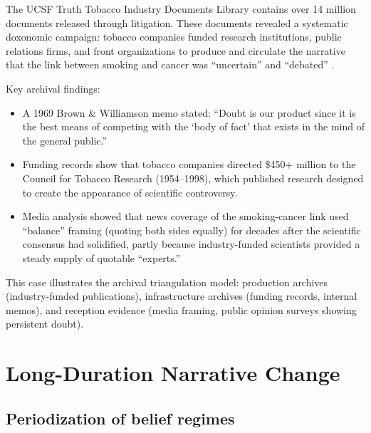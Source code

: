 \begin{example}
\label{ex:tobacco-archives}
The UCSF Truth Tobacco Industry Documents Library contains over 14 million documents released through litigation.
These documents revealed a systematic doxonomic campaign: tobacco companies funded research institutions, public relations firms, and front organizations to produce and circulate the narrative that the link between smoking and cancer was ``uncertain'' and ``debated'' \autocite{oreskes2010}.

Key archival findings:
\begin{itemize}[nosep]
  \item A 1969 Brown \& Williamson memo stated: ``Doubt is our product since it is the best means of competing with the `body of fact' that exists in the mind of the general public.''
  \item Funding records show that tobacco companies directed \$450+ million to the Council for Tobacco Research (1954--1998), which published research designed to create the appearance of scientific controversy.
  \item Media analysis showed that news coverage of the smoking-cancer link used ``balance'' framing (quoting both sides equally) for decades after the scientific consensus had solidified, partly because industry-funded scientists provided a steady supply of quotable ``experts.''
\end{itemize}

This case illustrates the archival triangulation model: production archives (industry-funded publications), infrastructure archives (funding records, internal memos), and reception evidence (media framing, public opinion surveys showing persistent doubt).
\end{example}

\section{Long-Duration Narrative Change}
\label{sec:ch18-longue-duree}

\subsection{Periodization of belief regimes}

